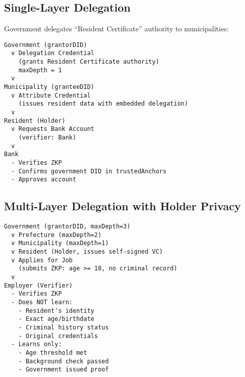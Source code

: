 \subsection{Single-Layer Delegation}

Government delegates ``Resident Certificate'' authority to municipalities:

\begin{center}
\begin{verbatim}
Government (grantorDID)
  v Delegation Credential
    (grants Resident Certificate authority)
    maxDepth = 1
  v
Municipality (granteeDID)
  v Attribute Credential
    (issues resident data with embedded delegation)
  v
Resident (Holder)
  v Requests Bank Account
    (verifier: Bank)
  v
Bank
  - Verifies ZKP
  - Confirms government DID in trustedAnchors
  - Approves account
\end{verbatim}
\end{center}

\subsection{Multi-Layer Delegation with Holder Privacy}

\begin{center}
\begin{verbatim}
Government (grantorDID, maxDepth=3)
  v Prefecture (maxDepth=2)
  v Municipality (maxDepth=1)
  v Resident (Holder, issues self-signed VC)
  v Applies for Job
    (submits ZKP: age >= 18, no criminal record)
  v
Employer (Verifier)
  - Verifies ZKP
  - Does NOT learn:
    - Resident's identity
    - Exact age/birthdate
    - Criminal history status
    - Original credentials
  - Learns only:
    - Age threshold met
    - Background check passed
    - Government issued proof
\end{verbatim}
\end{center}

